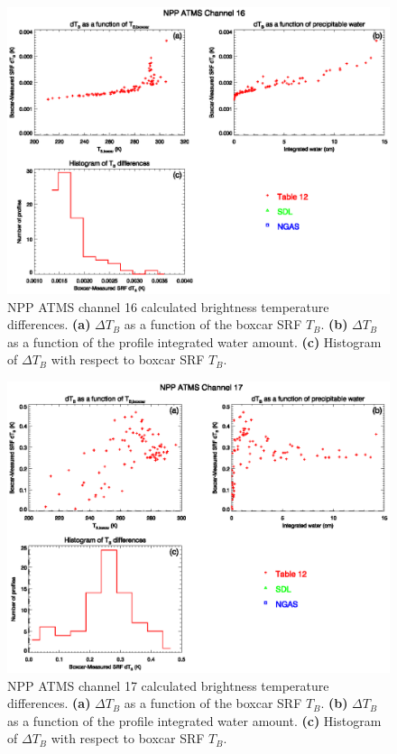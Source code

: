 \begin{figure}[H]
  \centering
  \includegraphics[scale=1]{graphics/dtb/atms_npp.ch16.TbStats.eps}
  \caption{NPP ATMS channel 16 calculated brightness temperature differences. \textbf{(a)} $\Delta T_B$ as a function of the boxcar SRF $T_B$. \textbf{(b)} $\Delta T_B$ as a function of the profile integrated water amount. \textbf{(c)} Histogram of $\Delta T_B$ with respect to boxcar SRF $T_B$.}
  \label{fig:atms_npp.ch16.dtb}
\end{figure}

\begin{figure}[H]
  \centering
  \includegraphics[scale=1]{graphics/dtb/atms_npp.ch17.TbStats.eps}
  \caption{NPP ATMS channel 17 calculated brightness temperature differences. \textbf{(a)} $\Delta T_B$ as a function of the boxcar SRF $T_B$. \textbf{(b)} $\Delta T_B$ as a function of the profile integrated water amount. \textbf{(c)} Histogram of $\Delta T_B$ with respect to boxcar SRF $T_B$.}
  \label{fig:atms_npp.ch17.dtb}
\end{figure}

